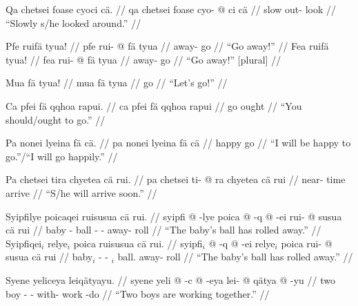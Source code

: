 \documentclass{article}
\begin{document}
\ex[lingstyle=QuCheanya] \begingl
\glpreamble Qa chetsei foase cyoci c\"a. //
\gla qa chetsei foase cyo- @ ci c\"a //
\glb {}  slow out- look  //
\glft ``Slowly s/he looked around.'' //
\endgl \xe

\pex[lingstyle=QuCheanya] 
\a \begingl
\glpreamble Pfe ruif\"a tyua! //
\gla pfe rui- @ f\"a tyua //
\glb {} away- go  //
\glft ``Go away!'' //
\endgl 
\a \begingl
\glpreamble Fea ruif\"a tyua! //
\gla fea rui- @ f\"a tyua //
\glb {} away- go  //
\glft ``Go away!'' [plural] //
\endgl
\xe

\ex[lingstyle=QuCheanya] \begingl
\glpreamble Mua f\"a tyua! //
\gla mua f\"a tyua //
\glb {} go  //
\glft ``Let's go!'' //
\endgl \xe

\ex[lingstyle=QuCheanya] \begingl
\glpreamble Ca pfei f\"a qqhoa rapui. //
\gla ca pfei f\"a qqhoa rapui //
\glb {}  go  ought //
\glft ``You should/ought to go.'' //
\endgl \xe

\ex[lingstyle=QuCheanya] \begingl
\glpreamble Pa nonei lyeina f\"a c\"a. //
\gla pa nonei lyeina f\"a c\"a //
\glb {}  happy go  //
\glft ``I will be happy to go.''/``I will go happily.'' //
\endgl \xe

\ex[lingstyle=QuCheanya] \begingl
\glpreamble Pa chetsei tira chyetea c\"a rui. //
\gla pa chetsei ti- @ ra chyetea c\"a rui //
\glb {}  near- time arrive   //
\glft ``S/he will arrive soon.'' //
\endgl \xe

\pex[lingstyle=QuCheanya] 
\a \begingl
\glpreamble Syipfilye poicaqei ruisusua c\"a rui. //
\gla syipfi @ -lye poica @ -q @ -ei rui- @ susua c\"a rui //
\glb baby - ball - - away- roll   //
\glft ``The baby's ball has rolled away.'' //
\endgl
\a \begingl
\glpreamble Syipfiqei$_i$ relye$_i$ poica ruisusua c\"a rui. //
\gla syipfi$_i$ @ -q @ -ei relye$_i$ poica rui- @ susua c\"a rui //
\glb baby$_i$ - - $_i$ ball. away- roll   //
\glft ``The baby's ball has rolled away.'' //
\endgl
\xe

\ex[lingstyle=QuCheanya] \begingl
\glpreamble Syene yeliceya leiq\"atyayu. //
\gla syene yeli @ -c @ -eya lei- @ q\"atya @ -yu //
\glb two boy - - with- work -do //
\glft ``Two boys are working together.'' //
\endgl \xe
\end{document}
